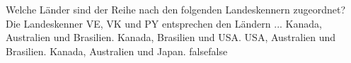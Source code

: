     {Welche Länder sind der Reihe nach den folgenden Landeskennern zugeordnet? Die Landeskenner VE, VK und PY entsprechen den Ländern ...}
    {Kanada, Australien und Brasilien.}
    {Kanada, Brasilien und USA.}
    {USA, Australien und Brasilien.}
    {Kanada, Australien und Japan.}
    {false}{false}